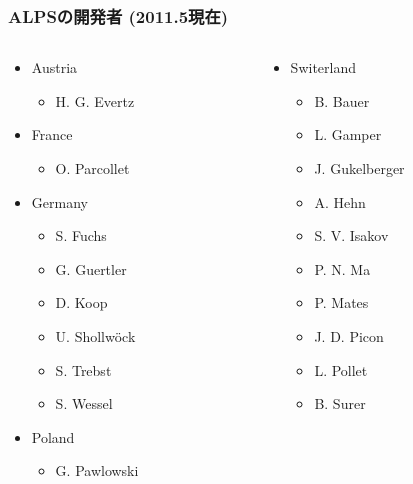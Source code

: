 \begin{frame}
  \frametitle{ALPSの開発者 (2011.5現在)}
  \begin{columns}[T]
    \begin{column}{.33\textwidth}
      \begin{itemize}
      \item Austria
        \begin{itemize}
        \item H. G. Evertz
        \end{itemize}
      \item France
        \begin{itemize}
        \item O. Parcollet
        \end{itemize}
      \item Germany
        \begin{itemize}
        \item S. Fuchs
        \item G. Guertler
        \item D. Koop
        \item U. Shollw\"ock
        \item S. Trebst
        \item S. Wessel
        \end{itemize}
      \item Poland
        \begin{itemize}
        \item G. Pawlowski
        \end{itemize}
      \end{itemize}
    \end{column}
    \begin{column}{.35\textwidth}
      \begin{itemize}
      \item Switerland
        \begin{itemize}
        \item B. Bauer
        \item L. Gamper
        \item J. Gukelberger
        \item A. Hehn
        \item S. V. Isakov
        \item P. N. Ma
        \item P. Mates
        \item J. D. Picon
        \item L. Pollet
        \item B. Surer

\end{itemize}
\end{itemize}
\end{column}
\end{columns}
\end{frame}
